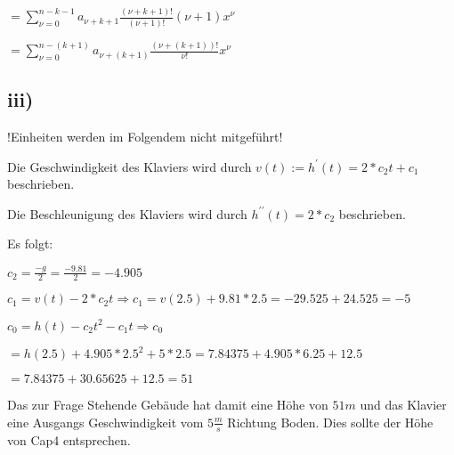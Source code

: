 $ = \sum\limits^{n-k-1}_{\nu=0} a_{\nu+k+1} \frac{(\nu+k+1)!}{(\nu+1)!} (\nu+1)x^{\nu}$

$ = \sum\limits^{n -(k+1)}_{\nu=0} a_{\nu+(k+1)} \frac{(\nu+(k+1))!}{\nu!} x^{\nu}$


\pagebreak
\subsection*{iii)}

\begin{large}
!Einheiten werden im Folgendem nicht mitgeführt!
\end{large}

Die Geschwindigkeit des Klaviers wird durch $v(t) := h^{\prime}(t) = 2 * c_{2}t + c_{1}$ beschrieben.

Die Beschleunigung des Klaviers wird durch $h^{\prime\prime}(t) = 2 * c_{2}$ beschrieben.

Es folgt:

$c_{2} = \frac{-g}{2} = \frac{-9.81}{2} = -4.905 $

$c_{1} = v(t) - 2*c_{2}t \Longrightarrow c_{1} = v(2.5) + 9.81*2.5 = -29.525 + 24.525 = -5$

$c_{0} = h(t) - c_{2}t^{2} - c_{1}t \Longrightarrow c_{0}$

$= h(2.5) + 4.905 * 2.5^{2} + 5 * 2.5 = 7.84375 + 4.905 * 6.25 + 12.5$
 
$ = 7.84375 + 30.65625 + 12.5 = 51$

Das zur Frage Stehende Gebäude hat damit eine Höhe von $51m$ und das Klavier eine Ausgangs Geschwindigkeit vom $5\frac{m}{s}$ Richtung Boden.
Dies sollte der Höhe von Cap4 entsprechen.
       
 